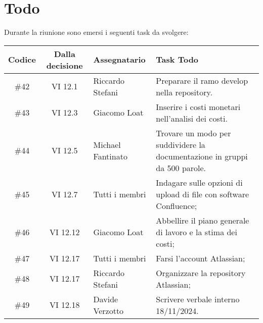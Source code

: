 
\section{Todo}

Durante la riunione sono emersi i seguenti task da svolgere:

\vspace{0.5cm}

\begin{table}[htbp]
\centering
{}
\begin{tabular}{|c|c|p{}|p{}|}
    \hline
    \rowcolor[gray]{0.75}
    \textbf{Codice} & \textbf{Dalla decisione} & \textbf{Assegnatario} & \textbf{Task Todo} \\
    \hline
    \#42 & VI 12.1 & Riccardo Stefani & Preparare il ramo develop nella repository. \\
    \hline
    \#43 & VI 12.3 & Giacomo Loat & Inserire i costi monetari nell'analisi dei costi. \\
    \hline
    \#44 & VI 12.5 & Michael Fantinato & Trovare un modo per suddividere la documentazione in gruppi da 500 parole. \\
    \hline
    \#45 & VI 12.7 & Tutti i membri & Indagare sulle opzioni di upload di file con software Confluence; \\
    \hline
    \#46 & VI 12.12 & Giacomo Loat & Abbellire il piano generale di lavoro e la stima dei costi; \\
    \hline
    \#47 & VI 12.17 & Tutti i membri & Farsi l'account Atlassian; \\
    \hline
    \#48 & VI 12.17 & Riccardo Stefani & Organizzare la repository Atlassian; \\
    \hline
    \#49 & VI 12.18 & Davide Verzotto & Scrivere verbale interno 18/11/2024. \\
   \hline
\end{tabular}
\end{table}